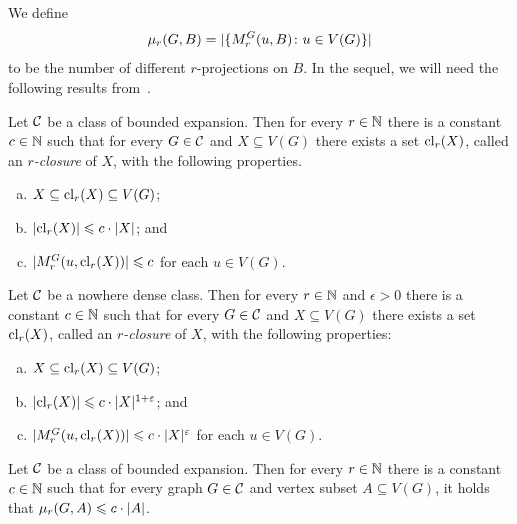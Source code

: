 We define 
\[\mu_r(G,B)=|\{M_r^G(u,B)\colon u\in V(G)\}|\]
to be the number of different $r$-projections on $B$.
In the sequel, we will need the following results from~\cite{drange2016kernelization,eickmeyer2016neighborhood}.

\begin{lemma}\label{lem:closure-be}
Let $\mathcal{C}$ be a class of bounded expansion. 
Then for every $r\in \mathbb{N}$ there is a constant $c\in \mathbb{N}$ such that for
every $G\in \mathcal{C}$ and $X\subseteq V(G)$ there exists a set $\mathrm{cl}_r(X)$, called an {\em{$r$-closure}} of $X$, with the following properties. 
\begin{enumerate}[(a)]
  \item $X\subseteq \mathrm{cl}_r(X)\subseteq V(G)$;
  \item $|\mathrm{cl}_r(X)|\leqslant c\cdot |X|$; and
  \item $|M_r^G(u,\mathrm{cl}_r(X))|\leqslant c$ for each $u\in V(G)$.
\end{enumerate}
\end{lemma}

\begin{lemma}\label{lem:closure-nd}
Let $\mathcal{C}$ be a nowhere dense class. 
Then for every $r\in\mathbb{N}$ and $\epsilon>0$ there is a 
constant $c\in\mathbb{N}$ such that for every $G\in \mathcal{C}$ and $X\subseteq V(G)$ there exists a set 
$\mathrm{cl}_r(X)$,  called an {\em{$r$-closure}} of $X$, 
with the following properties: 
\begin{enumerate}[(a)]
  \item $X\subseteq \mathrm{cl}_r(X)\subseteq V(G)$;
  \item $|\mathrm{cl}_r(X)|\leqslant c\cdot |X|^{1+\varepsilon}$; and
  \item $|M_r^G(u,\mathrm{cl}_r(X))|\leqslant c\cdot |X|^{\varepsilon}$ for each $u\in V(G)$.
\end{enumerate}
\end{lemma}

\begin{lemma}\label{lem:projection-complexity-be}
Let $\mathcal{C}$ be a class of bounded expansion. Then for every $r\in \mathbb{N}$ there is 
  a constant $c\in\mathbb{N}$ such that for every graph $G\in \mathcal{C}$ and vertex subset $A\subseteq V(G)$, 
  it holds that $\mu_r(G,A)\leqslant c\cdot |A|$.
\end{lemma}

